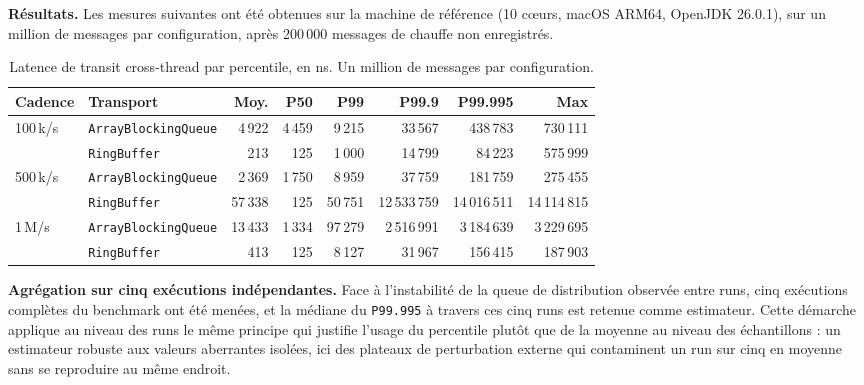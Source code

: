 \textbf{Résultats.} Les mesures suivantes ont été obtenues sur la machine de référence (10 cœurs, macOS ARM64, OpenJDK 26.0.1), sur un million de messages par configuration, après 200\,000 messages de chauffe non enregistrés.

\begin{table}[H]
    \centering
    \small
    \begin{tabular}{|l|l|r|r|r|r|r|r|}
        \hline
        Cadence & Transport & \textbf{Moy.} & \textbf{P50} & \textbf{P99} & \textbf{P99.9} & \textbf{P99.995} & \textbf{Max} \\
        \hline
        \multirow{2}{*}{100\,k/s}
          & \texttt{ArrayBlockingQueue} & 4\,922 & 4\,459 & 9\,215 & 33\,567 & 438\,783 & 730\,111 \\
          & \texttt{RingBuffer}         & 213   & 125   & 1\,000 & 14\,799 & 84\,223  & 575\,999 \\
        \hline
        \multirow{2}{*}{500\,k/s}
          & \texttt{ArrayBlockingQueue} & 2\,369 & 1\,750 & 8\,959 & 37\,759 & 181\,759 & 275\,455 \\
          & \texttt{RingBuffer}         & 57\,338 & 125  & 50\,751 & 12\,533\,759 & 14\,016\,511 & 14\,114\,815 \\
        \hline
        \multirow{2}{*}{1\,M/s}
          & \texttt{ArrayBlockingQueue} & 13\,433 & 1\,334 & 97\,279 & 2\,516\,991 & 3\,184\,639 & 3\,229\,695 \\
          & \texttt{RingBuffer}         & 413   & 125   & 8\,127 & 31\,967 & 156\,415 & 187\,903 \\
        \hline
    \end{tabular}
    \caption{Latence de transit cross-thread par percentile, en ns. Un million de messages par configuration.}
    \label{tab:jalon1-transport-latency}
\end{table}

\textbf{Agrégation sur cinq exécutions indépendantes.} Face à l'instabilité de la queue de distribution observée entre runs, cinq exécutions complètes du benchmark ont été menées, et la médiane du \texttt{P99.995} à travers ces cinq runs est retenue comme estimateur. Cette démarche applique au niveau des runs le même principe qui justifie l'usage du percentile plutôt que de la moyenne au niveau des échantillons : un estimateur robuste aux valeurs aberrantes isolées, ici des plateaux de perturbation externe qui contaminent un run sur cinq en moyenne sans se reproduire au même endroit.

